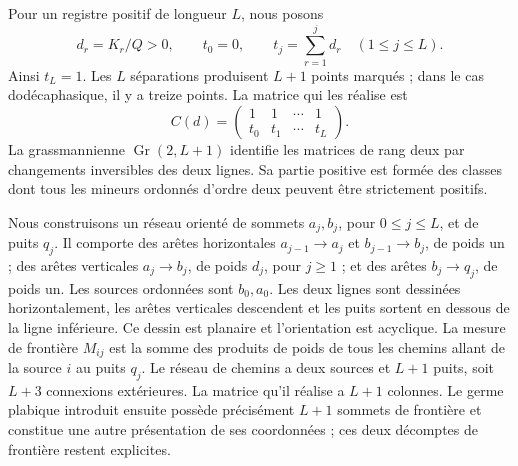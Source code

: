 Pour un registre positif de longueur \(L\), nous posons
\[
 d_r=K_r/Q>0,\qquad t_0=0,\qquad
 t_j=\sum_{r=1}^jd_r\quad(1\le j\le L).
\]
Ainsi \(t_L=1\). Les \(L\) séparations produisent \(L+1\) points marqués ;
dans le cas dodécaphasique, il y a treize points. La matrice qui les réalise est
\begin{equation}
 C(d)=\begin{pmatrix}1&1&\cdots&1\\t_0&t_1&\cdots&t_L\end{pmatrix}.
 \label{eq:nc-path-matrix}
\end{equation}
La grassmannienne \(\operatorname{Gr}(2,L+1)\) identifie les matrices de rang
deux par changements inversibles des deux lignes. Sa partie positive est formée
des classes dont tous les mineurs ordonnés d’ordre deux
peuvent être strictement positifs.

Nous construisons un réseau orienté de sommets \(a_j,b_j\), pour \(0\le j\le L\), et de puits \(q_j\). Il comporte des arêtes horizontales \(a_{j-1}\to a_j\) et \(b_{j-1}\to b_j\), de poids un ; des arêtes verticales \(a_j\to b_j\), de poids \(d_j\), pour \(j\ge1\) ; et des arêtes \(b_j\to q_j\), de poids un. Les sources ordonnées sont \(b_0,a_0\). Les deux lignes sont dessinées horizontalement, les arêtes verticales descendent et les puits sortent en dessous de la ligne inférieure. Ce dessin est planaire et l'orientation est acyclique. La mesure de frontière \(M_{ij}\) est la somme des produits de poids de tous les chemins allant de la source \(i\) au puits \(q_j\). Le réseau de chemins a deux sources et \(L+1\) puits, soit \(L+3\) connexions extérieures. La matrice qu'il réalise a \(L+1\) colonnes. Le germe plabique introduit ensuite possède précisément \(L+1\) sommets de frontière et constitue une autre présentation de ses coordonnées ; ces deux décomptes de frontière restent explicites.

